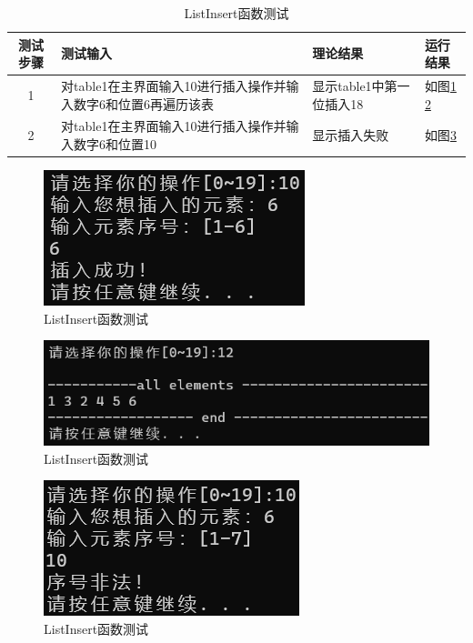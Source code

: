 \documentclass[supercite]{Experimental_Report}
\theoremstyle{definition}
\begin{document}
\begin{enumerate}
	\begin{table}[h!]
		\begin{center}
			\caption{ListInsert函数测试}
			\begin{tabular}{|c|p{4cm}<{\centering}|p{4cm}<{\centering}|p{4cm}<{\centering}|} 
				\hline
				\textbf{测试步骤} & \textbf{测试输入} & \textbf{理论结果} & \textbf{运行结果} \\
				\hline
				1 & 对table1在主界面输入10进行插入操作并输入数字6和位置6再遍历该表 & 显示table1中第一位插入18 & 如图\ref{fig1-9-1} \ref{fig1-9-2}\\
				\hline
				2 & 对table1在主界面输入10进行插入操作并输入数字6和位置10 & 显示插入失败 & 如图\ref{fig1-9-3}\\
				\hline
			\end{tabular}
		\end{center}
	\end{table}
	
	
	\begin{figure}[H] %
		\begin{center}
			\includegraphics[width=0.5\linewidth]{images/linklist/10-1.png}
			\caption{ListInsert函数测试}
			\label{fig1-9-1}
		\end{center}
	\end{figure}
\begin{figure}[H] %
	\begin{center}
		\includegraphics[width=0.5\linewidth]{images/linklist/10-12.png}
		\caption{ListInsert函数测试}
		\label{fig1-9-2}
	\end{center}
\end{figure}

\begin{figure}[H] %
	\begin{center}
		\includegraphics[width=0.5\linewidth]{images/linklist/10-2.png}
		\caption{ListInsert函数测试}
		\label{fig1-9-3}
	\end{center}
\end{figure}
	

\end{enumerate}
\end{document}
